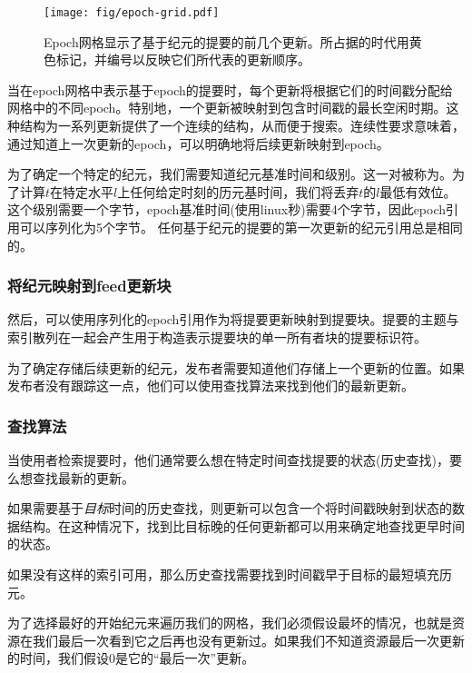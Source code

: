 \begin{figure}[htbp]
\centering
\texttt{[image: fig/epoch-grid.pdf]}
\caption[Epoch网格与基于纪元的feed updates\statusorange]{Epoch网格显示了基于纪元的提要的前几个更新。所占据的时代用黄色标记，并编号以反映它们所代表的更新顺序。 }
\label{fig:epoch-grid}
\end{figure}

当在epoch网格中表示基于epoch的提要时，每个更新将根据它们的时间戳分配给网格中的不同epoch。特别地，一个更新被映射到包含时间戳的最长空闲时期。这种结构为一系列更新提供了一个连续的结构，从而便于搜索。连续性要求意味着，通过知道上一次更新的epoch，可以明确地将后续更新映射到epoch。


为了确定一个特定的纪元，我们需要知道纪元基准时间和级别。这一对被称为。为了计算$t$在特定水平$l$上任何给定时刻的历元基时间，我们将丢弃$t$的$l$最低有效位。
这个级别需要一个字节，epoch基准时间(使用linux秒)需要4个字节，因此epoch引用可以序列化为5个字节。
任何基于纪元的提要的第一次更新的纪元引用总是相同的。

\subsubsection{将纪元映射到feed更新块}

然后，可以使用序列化的epoch引用作为将提要更新映射到提要块。提要的主题与索引散列在一起会产生用于构造表示提要块的单一所有者块的提要标识符。

为了确定存储后续更新的纪元，发布者需要知道他们存储上一个更新的位置。如果发布者没有跟踪这一点，他们可以使用查找算法来找到他们的最新更新。



\subsubsection{查找算法}

当使用者检索提要时，他们通常要么想在特定时间查找提要的状态(历史查找)，要么想查找最新的更新。

如果需要基于\emph{目标}时间的历史查找，则更新可以包含一个将时间戳映射到状态的数据结构。在这种情况下，找到比目标晚的任何更新都可以用来确定地查找更早时间的状态。

如果没有这样的索引可用，那么历史查找需要找到时间戳早于目标的最短填充历元。

为了选择最好的开始纪元来遍历我们的网格，我们必须假设最坏的情况，也就是资源在我们最后一次看到它之后再也没有更新过。如果我们不知道资源最后一次更新的时间，我们假设0是它的“最后一次”更新。

